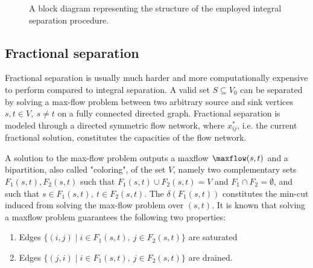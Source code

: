 \begin{figure}[ht]
	\centering
	\caption{A block diagram representing the structure of the employed integral separation procedure.}
	\label{fig:integral-separation-block-diagram}
\end{figure}

\subsection{Fractional separation}
\label{sec:impl-fractional-separation}

Fractional separation is usually much harder and more computationally expensive to perform compared to integral separation.
A valid set $S \subseteq V_0$ can be separated by solving a max-flow problem between two arbitrary source and sink vertices $s, t \in V,\ s \ne t$ on a fully connected directed graph.
Fractional separation is modeled through a directed symmetric flow network, where $x^*_{ij}$, i.e. the current fractional solution, constitutes the capacities of the flow network.

A solution to the max-flow problem outputs a maxflow $\maxflow(s, t)$ and a bipartition, also called "coloring", of the set $V$, namely two complementary sets $F_1(s, t), F_2(s, t)$ such that $F_1(s, t) \cup F_2(s, t) = V$ and $F_1 \cap F_2 = \emptyset$, and such that $s \in F_1(s, t),\ t \in F_2(s, t)$.
The $\delta(F_1(s, t))$ constitutes the min-cut induced from solving the max-flow problem over $(s, t)$.
It is known that solving a maxflow problem guarantees the following two properties:

\begin{enumerate}
	\item Edges $\{ (i, j) \mid i \in F_1(s, t),\ j \in F_2(s, t) \}$ are saturated
	\item Edges $\{ (j, i) \mid i \in F_1(s, t),\ j \in F_2(s, t) \}$ are drained.
\end{enumerate}

